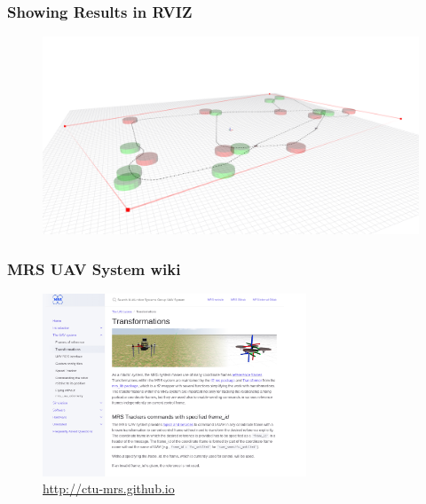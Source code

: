 \documentclass[aspectratio=1610]{beamer}
\begin{document}


  \begin{frame}
    \frametitle{Showing Results in RVIZ}

    \begin{figure}
      \includegraphics[width=1.0\textwidth]{./fig/rviz_2.png}
    \end{figure}

  \end{frame}




  \begin{frame}
    \frametitle{MRS UAV System wiki}
    \begin{figure}
      \vspace{-1em}
      \caption*{\url{http://ctu-mrs.github.io}}
      \includegraphics[width=0.7\textwidth]{./fig/wiki.png}
    \end{figure}

  \end{frame}
\end{document}
